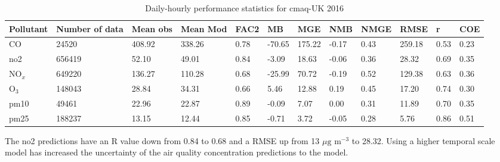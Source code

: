 \begin{table}[H]
\caption{Daily-hourly performance statistics for \gls{cmaq}-UK 2016}
\scriptsize
\centering
\begin{tabular}{|p{1cm}|p{1cm}|p{0.8cm}|p{1cm}|p{0.6cm}|p{1cm}|p{1cm}|p{0.8cm}|p{0.8cm}|p{0.8cm}|p{0.6cm}|p{0.7cm}|}
\hline
\textbf{Pollutant} & \textbf{Number of data} & \textbf{Mean obs} & \textbf{Mean Mod} & \textbf{FAC2} & \textbf{MB} & \textbf{MGE} & \textbf{NMB} & \textbf{NMGE} & \textbf{RMSE} & \textbf{r} & \textbf{COE} \\ \hline
CO         & 24520  & 408.92 & 338.26 & 0.78 & -70.65 & 175.22 & -0.17  & 0.43 & 259.18 & 0.53 & 0.23  \\ \hline
\gls{no2}   & 656419 & 52.10  & 49.01  & 0.84 & -3.09  & 18.63  & -0.06  & 0.36 & 28.32  & 0.69 & 0.35  \\ \hline
NO$_{x}$   & 649220 & 136.27 & 110.28 & 0.68 & -25.99 & 70.72  & -0.19  & 0.52 & 129.38 & 0.63 & 0.36   \\ \hline
O$_{3}$    & 148043 & 28.84  & 34.31  & 0.66 & 5.46   & 12.88  &  0.19  & 0.45 & 17.20  & 0.74 & 0.30   \\ \hline
\gls{pm10}  & 49461  & 22.96  & 22.87  & 0.89 & -0.09  & 7.07   &  0.00  & 0.31 & 11.89  & 0.70 & 0.35   \\ \hline
\gls{pm25} & 188237 & 13.15  & 12.44  & 0.85 & -0.71  & 3.72   &  -0.05 & 0.28 & 5.76   & 0.86 & 0.51  \\ \hline
\end{tabular}
\label{tab:cmaq_performance_stats_2016_hourly}
\end{table}

The \gls{no2} predictions have an R value down from 0.84 to 0.68 and a RMSE up from 13 $\mu \text{g m}^{-3}$ to 28.32. Using a higher temporal scale model has increased the uncertainty of the air quality concentration predictions to the model.

